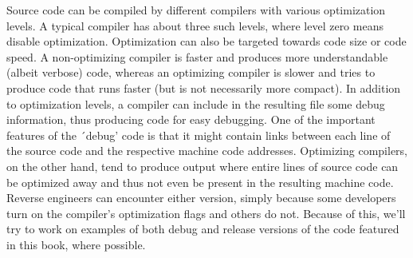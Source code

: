 Source code can be compiled by different compilers with various optimization levels.
A typical compiler has about three such levels, where level zero means disable optimization.
Optimization can also be targeted towards code size or code speed.
A non-optimizing compiler is faster and produces more understandable (albeit verbose) code,
whereas an optimizing compiler is slower and tries to produce code that runs faster (but is not necessarily more compact).
In addition to optimization levels, a compiler can include in the resulting file some debug information,
thus producing code for easy debugging.
One of the important features of the ´debug' code is that it might contain links
between each line of the source code and the respective machine code addresses.
Optimizing compilers, on the other hand, tend to produce output where entire lines of source code
can be optimized away and thus not even be present in the resulting machine code.
Reverse engineers can encounter either version, simply because some developers turn on the compiler's optimization flags and others do not. 
Because of this, we'll try to work on examples of both debug and release versions of the code featured in this book, where possible.
